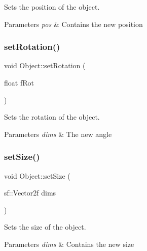 Sets the position of the object. 


\begin{DoxyParams}{Parameters}
{\em pos} & Contains the new position \\
\hline
\end{DoxyParams}
\mbox{\label{class_object_a5e1b5e2598ab219cc45b960c5d96c656}} 
\subsubsection{\texorpdfstring{set\+Rotation()}{setRotation()}}
{\footnotesize\ttfamily void Object\+::set\+Rotation (\begin{DoxyParamCaption}\item[{float}]{f\+Rot }\end{DoxyParamCaption})}



Sets the rotation of the object. 


\begin{DoxyParams}{Parameters}
{\em dims} & The new angle \\
\hline
\end{DoxyParams}
\mbox{\label{class_object_a07e8d31921144019dab0ae66d3530d83}} 
\subsubsection{\texorpdfstring{set\+Size()}{setSize()}}
{\footnotesize\ttfamily void Object\+::set\+Size (\begin{DoxyParamCaption}\item[{sf\+::\+Vector2f}]{dims }\end{DoxyParamCaption})}



Sets the size of the object. 


\begin{DoxyParams}{Parameters}
{\em dims} & Contains the new size \\
\hline
\end{DoxyParams}
\mbox{\label{class_object_afc2a48e052cf81a72500eb24ace88bb1}} 
